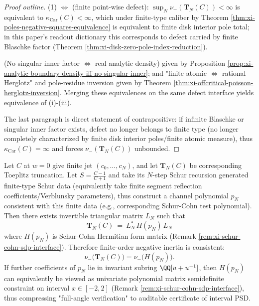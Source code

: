 \begin{proof}[Proof outline]
(1) \(\Longleftrightarrow\) (finite point-wise defect):
\(\sup_N\nu_-(\mathbf{T}_N(C))<\infty\) is equivalent to \(\kappa_{\mathrm{Car}}(C)<\infty\), which under finite-type caliber by Theorem \ref{thm:xi-poles-negative-squares-equivalence} is equivalent to finite disk interior pole total; in this paper's readout dictionary this corresponds to defect carried by finite Blaschke factor (Theorem \ref{thm:xi-disk-zero-pole-index-reduction}).
\par
(No singular inner factor \(\Longleftrightarrow\) real analytic density) given by Proposition \ref{prop:xi-analytic-boundary-density-iff-no-singular-inner};
and "finite atomic \(\Longleftrightarrow\) rational Herglotz" and pole-residue inversion given by Theorem \ref{thm:xi-offcritical-poisson-herglotz-inversion}.
Merging these equivalences on the same defect interface yields equivalence of (i)-(iii).
\par
The last paragraph is direct statement of contrapositive: if infinite Blaschke or singular inner factor exists, defect no longer belongs to finite type (no longer completely characterized by finite disk interior poles/finite atomic measure), thus \(\kappa_{\mathrm{Car}}(C)=\infty\) and forces \(\nu_-(\mathbf{T}_N(C))\) unbounded.
\end{proof}

\begin{theorem}\label{thm:xi-toeplitz-schur-cohn-inertia-alignment}
Let \(C\) at \(w=0\) give finite jet \((c_0,\dots,c_N)\), and let \(\mathbf{T}_N(C)\) be corresponding Toeplitz truncation.
Let \(S=\frac{C-1}{C+1}\) and take its \(N\)-step Schur recursion generated finite-type Schur data (equivalently take finite segment reflection coefficients/Verblunsky parameters), thus construct a channel polynomial \(p_N\) consistent with this finite data (e.g., corresponding Schur-Cohn test polynomial).
Then there exists invertible triangular matrix \(L_N\) such that
\[
\boxed{\;
\mathbf{T}_N(C)\ =\ L_N^\ast\,H(p_N)\,L_N\;}
\]
where \(H(p_N)\) is Schur-Cohn Hermitian form matrix (Remark \ref{rem:xi-schur-cohn-sdp-interface}).
Therefore finite-order negative inertia is consistent:
\[
\boxed{\;
\nu_-\!\bigl(\mathbf{T}_N(C)\bigr)=\nu_-\!\bigl(H(p_N)\bigr).\;}
\]
If further coefficients of \(p_N\) lie in invariant subring \(\QQ[u+u^{-1}]\), then \(H(p_N)\) can equivalently be viewed as univariate polynomial matrix semidefinite constraint on interval \(x\in[-2,2]\) (Remark \ref{rem:xi-schur-cohn-sdp-interface}), thus compressing "full-angle verification" to auditable certificate of interval PSD.
\end{theorem}

